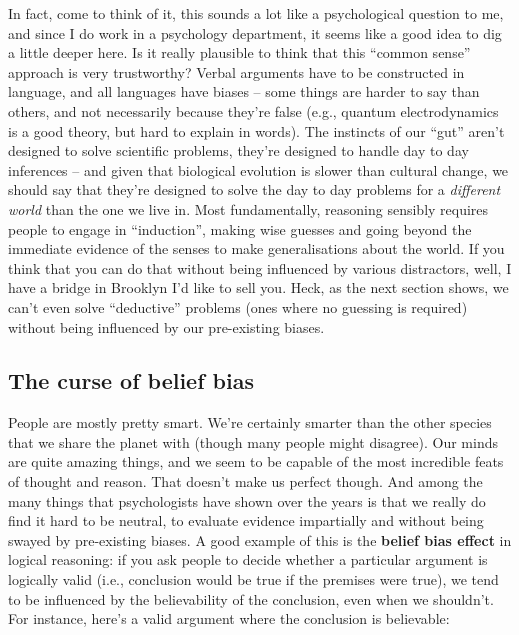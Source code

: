 \documentclass[]{book}
\begin{document}
In fact, come to think of it, this sounds a lot like a psychological question to me, and since I do work in a psychology department, it seems like a good idea to dig a little deeper here. Is it really plausible to think that this ``common sense'' approach is very trustworthy? Verbal arguments have to be constructed in language, and all languages have biases -- some things are harder to say than others, and not necessarily because they're false (e.g., quantum electrodynamics is a good theory, but hard to explain in words). The instincts of our ``gut'' aren't designed to solve scientific problems, they're designed to handle day to day inferences -- and given that biological evolution is slower than cultural change, we should say that they're designed to solve the day to day problems for a \emph{different world} than the one we live in. Most fundamentally, reasoning sensibly requires people to engage in ``induction'', making wise guesses and going beyond the immediate evidence of the senses to make generalisations about the world. If you think that you can do that without being influenced by various distractors, well, I have a bridge in Brooklyn I'd like to sell you. Heck, as the next section shows, we can't even solve ``deductive'' problems (ones where no guessing is required) without being influenced by our pre-existing biases.

\hypertarget{the-curse-of-belief-bias}{%
\subsection{The curse of belief bias}\label{the-curse-of-belief-bias}}

People are mostly pretty smart. We're certainly smarter than the other species that we share the planet with (though many people might disagree). Our minds are quite amazing things, and we seem to be capable of the most incredible feats of thought and reason. That doesn't make us perfect though. And among the many things that psychologists have shown over the years is that we really do find it hard to be neutral, to evaluate evidence impartially and without being swayed by pre-existing biases. A good example of this is the \textbf{belief bias effect} in logical reasoning: if you ask people to decide whether a particular argument is logically valid (i.e., conclusion would be true if the premises were true), we tend to be influenced by the believability of the conclusion, even when we shouldn't. For instance, here's a valid argument where the conclusion is believable:
\end{document}
